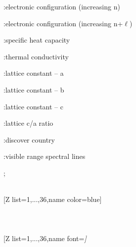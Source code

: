 {{\begin{minipage}{.45\linewidth}
\end{minipage}\begin{minipage}{.55\linewidth}\footnotesize
\begin{itemlist}
\item{}:\hspace{.5ex}electronic configuration (increasing n)
\item{}:\hspace{.5ex}electronic configuration (increasing n+$\ell$)
\item{}:\hspace{.5ex}specific heat capacity
\item{}:\hspace{.5ex}thermal conductivity
\item{}:\hspace{.5ex}lattice constant -- a
\item{}:\hspace{.5ex}lattice constant -- b
\item{}:\hspace{.5ex}lattice constant -- c
\item{}:\hspace{.5ex}lattice c/a ratio
\item{}:\hspace{.5ex}discover country
\item{}:\hspace{.5ex}visible range spectral lines
\end{itemlist}
\end{minipage}
};}\vfill%
\\ [5pt][Z list={1,...,36},name color=blue]%
\\ [10pt]\makebox[\linewidth][c]{\scalebox{.6}{\pgfPT[Z list={1,...,36},name color=blue]}}%
\\ [5pt]\pgfPTendoption%
\vfill%
\newpage\ \\ [-32pt]%
\\ [5pt][Z list={1,...,36},name font=\string\tiny\string\itshape]%
